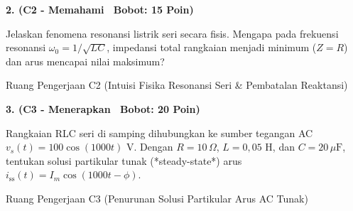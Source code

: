 \documentclass[10pt,a4paper]{article}
\begin{document}
\vspace{1mm}

\noindent\textbf{2. (C2 - Memahami \textbar\ Bobot: 15 Poin)}\par\vspace{0.5mm}
{\footnotesize Jelaskan fenomena resonansi listrik seri secara fisis. Mengapa pada frekuensi resonansi $\omega_0 = 1/\sqrt{LC}$, impedansi total rangkaian menjadi minimum ($Z = R$) dan arus mencapai nilai maksimum?}
\begin{answerbox}{Ruang Pengerjaan C2 (Intuisi Fisika Resonansi Seri \& Pembatalan Reaktansi)}
  \vspace{2.1cm}
\end{answerbox}

\vspace{1mm}

\noindent\textbf{3. (C3 - Menerapkan \textbar\ Bobot: 20 Poin)}\par\vspace{0.5mm}
\noindent\begin{minipage}[t]{0.60\textwidth}%
  {\footnotesize Rangkaian RLC seri di samping dihubungkan ke sumber tegangan AC $v_s(t) = 100 \cos(1000 t)\text{ V}$. Dengan $R = 10\,\Omega$, $L = 0{,}05\text{ H}$, dan $C = 20\,\mu\text{F}$, tentukan solusi partikular tunak (*steady-state*) arus $i_{\text{ss}}(t) = I_m \cos(1000 t - \phi)$.}%
\end{minipage}%
\hfill%
\begin{minipage}[t]{0.37\textwidth}%
  \centering
\end{minipage}\par\vspace{1mm}
\begin{answerbox}{Ruang Pengerjaan C3 (Penurunan Solusi Partikular Arus AC Tunak)}
  \vspace{2.8cm}
\end{answerbox}

\newpage
\end{document}
